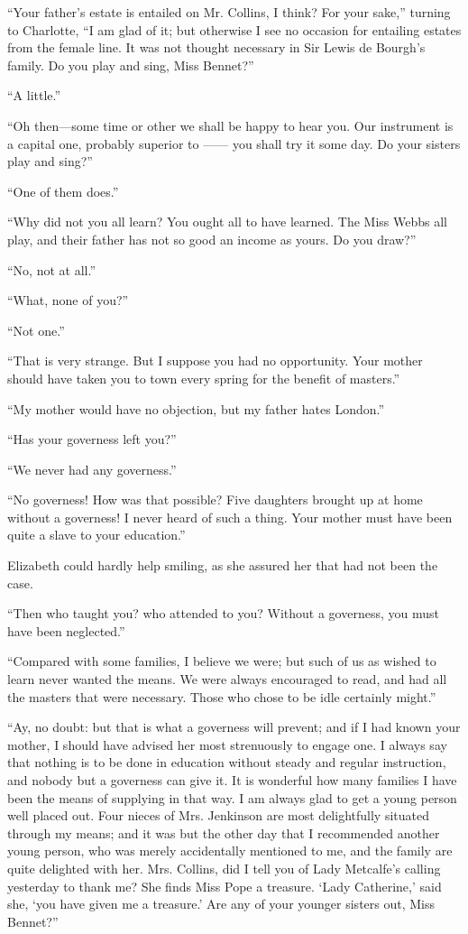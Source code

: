 \documentclass[12pt]{book}
\begin{document}
``Your father's estate is entailed on Mr. Collins, I think? For your sake,'' turning to Charlotte, ``I am glad of it; but otherwise I see no occasion for entailing estates from the female line. It was not thought necessary in Sir Lewis de Bourgh's family. Do you play and sing, Miss Bennet?''

``A little.''

``Oh then---some time or other we shall be happy to hear you. Our instrument is a capital one, probably superior to ------ you shall try it some day. Do your sisters play and sing?''

``One of them does.''

``Why did not you all learn? You ought all to have learned. The Miss Webbs all play, and their father has not so good an income as yours. Do you draw?''

``No, not at all.''

``What, none of you?''

``Not one.''

``That is very strange. But I suppose you had no opportunity. Your mother should have taken you to town every spring for the benefit of masters.''

``My mother would have no objection, but my father hates London.''

``Has your governess left you?''

``We never had any governess.''

``No governess! How was that possible? Five daughters brought up at home without a governess! I never heard of such a thing. Your mother must have been quite a slave to your education.''

Elizabeth could hardly help smiling, as she assured her that had not been the case.

``Then who taught you? who attended to you? Without a governess, you must have been neglected.''

``Compared with some families, I believe we were; but such of us as wished to learn never wanted the means. We were always encouraged to read, and had all the masters that were necessary. Those who chose to be idle certainly might.''

``Ay, no doubt: but that is what a governess will prevent; and if I had known your mother, I should have advised her most strenuously to engage one. I always say that nothing is to be done in education without steady and regular instruction, and nobody but a governess can give it. It is wonderful how many families I have been the means of supplying in that way. I am always glad to get a young person well placed out. Four nieces of Mrs. Jenkinson are most delightfully situated through my means; and it was but the other day that I recommended another young person, who was merely accidentally mentioned to me, and the family are quite delighted with her. Mrs. Collins, did I tell you of Lady Metcalfe's calling yesterday to thank me? She finds Miss Pope a treasure. `Lady Catherine,' said she, `you have given me a treasure.' Are any of your younger sisters out, Miss Bennet?''
\end{document}
